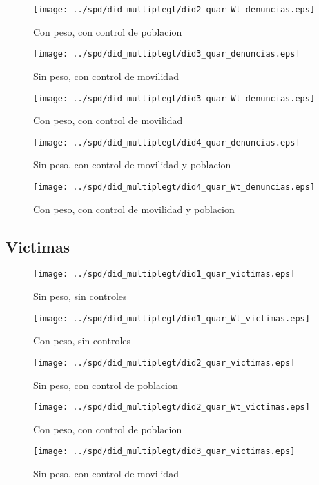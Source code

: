 \documentclass[11pt,letterpaper]{article}
\begin{document}
\begin{figure}[hbtp]
\caption{Con peso, con control de poblacion}
\centering
\texttt{[image: ../spd/did\_multiplegt/did2\_quar\_Wt\_denuncias.eps]}
\end{figure}
\begin{figure}[hbtp]
\caption{Sin peso, con control de movilidad}
\centering
\texttt{[image: ../spd/did\_multiplegt/did3\_quar\_denuncias.eps]}
\end{figure}

\begin{figure}[hbtp]
\caption{Con peso, con control de movilidad}
\centering
\texttt{[image: ../spd/did\_multiplegt/did3\_quar\_Wt\_denuncias.eps]}
\end{figure}
\begin{figure}[hbtp]
\caption{Sin peso, con control de movilidad y poblacion}
\centering
\texttt{[image: ../spd/did\_multiplegt/did4\_quar\_denuncias.eps]}
\end{figure}

\begin{figure}[hbtp]
\caption{Con peso, con control de movilidad y poblacion}
\centering
\texttt{[image: ../spd/did\_multiplegt/did4\_quar\_Wt\_denuncias.eps]}
\end{figure}

	\subsection{Victimas}
\begin{figure}[hbtp]
\caption{Sin peso, sin controles}
\centering
\texttt{[image: ../spd/did\_multiplegt/did1\_quar\_victimas.eps]}
\end{figure}

\begin{figure}[hbtp]
\caption{Con peso, sin controles}
\centering
\texttt{[image: ../spd/did\_multiplegt/did1\_quar\_Wt\_victimas.eps]}
\end{figure}
\begin{figure}[hbtp]
\caption{Sin peso, con control de poblacion}
\centering
\texttt{[image: ../spd/did\_multiplegt/did2\_quar\_victimas.eps]}
\end{figure}

\begin{figure}[hbtp]
\caption{Con peso, con control de poblacion}
\centering
\texttt{[image: ../spd/did\_multiplegt/did2\_quar\_Wt\_victimas.eps]}
\end{figure}
\begin{figure}[hbtp]
\caption{Sin peso, con control de movilidad}
\centering
\texttt{[image: ../spd/did\_multiplegt/did3\_quar\_victimas.eps]}
\end{figure}
\end{document}
